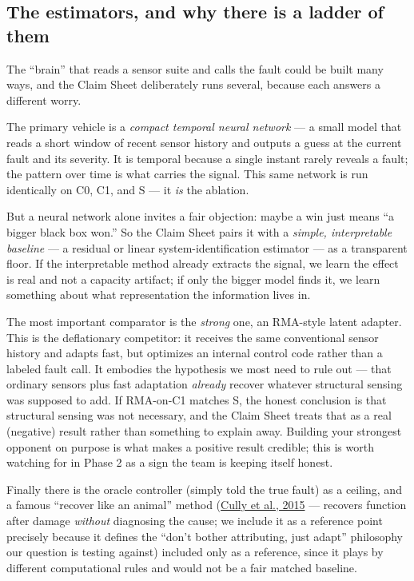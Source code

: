 \documentclass[12pt]{article}
\begin{document}
\subsection{The estimators, and why there is a ladder of them}

The ``brain'' that reads a sensor suite and calls the fault could be built many ways, and the Claim Sheet deliberately runs several, because each answers a different worry.

The primary vehicle is a \emph{compact temporal neural network} --- a small model that reads a short window of recent sensor history and outputs a guess at the current fault and its severity. It is temporal because a single instant rarely reveals a fault; the pattern over time is what carries the signal. This same network is run identically on C0, C1, and S --- it \emph{is} the ablation.

But a neural network alone invites a fair objection: maybe a win just means ``a bigger black box won.'' So the Claim Sheet pairs it with a \emph{simple, interpretable baseline} --- a residual or linear system-identification estimator --- as a transparent floor. If the interpretable method already extracts the signal, we learn the effect is real and not a capacity artifact; if only the bigger model finds it, we learn something about what representation the information lives in.

The most important comparator is the \emph{strong} one, an RMA-style latent adapter. This is the deflationary competitor: it receives the same conventional sensor history and adapts fast, but optimizes an internal control code rather than a labeled fault call. It embodies the hypothesis we most need to rule out --- that ordinary sensors plus fast adaptation \emph{already} recover whatever structural sensing was supposed to add. If RMA-on-C1 matches S, the honest conclusion is that structural sensing was not necessary, and the Claim Sheet treats that as a real (negative) result rather than something to explain away. Building your strongest opponent on purpose is what makes a positive result credible; this is worth watching for in Phase 2 as a sign the team is keeping itself honest.

Finally there is the oracle controller (simply told the true fault) as a ceiling, and a famous ``recover like an animal'' method (\href{https://doi.org/10.1038/nature14422}{Cully et al., 2015} --- recovers function after damage \emph{without} diagnosing the cause; we include it as a reference point precisely because it defines the ``don't bother attributing, just adapt'' philosophy our question is testing against) included only as a reference, since it plays by different computational rules and would not be a fair matched baseline.
\end{document}
